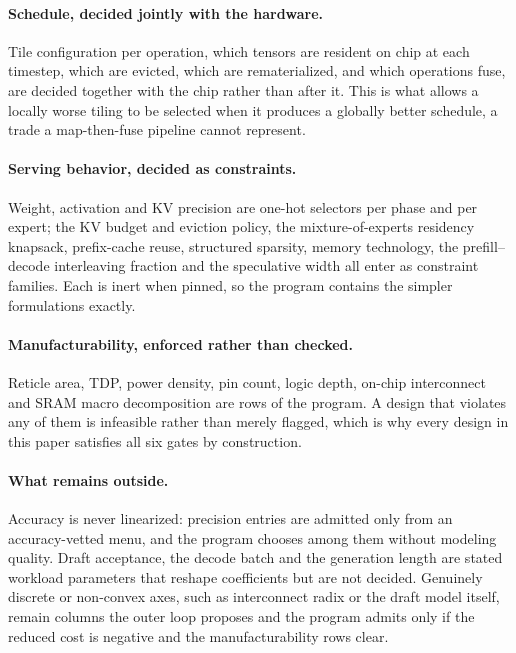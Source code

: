 \paragraph{Schedule, decided jointly with the hardware.}
Tile configuration per operation, which tensors are resident on chip at each
timestep, which are evicted, which are rematerialized, and which operations fuse,
are decided together with the chip rather than after it. This is what allows a
locally worse tiling to be selected when it produces a globally better schedule,
a trade a map-then-fuse pipeline cannot represent.

\paragraph{Serving behavior, decided as constraints.}
Weight, activation and KV precision are one-hot selectors per phase and per
expert; the KV budget and eviction policy, the mixture-of-experts residency
knapsack, prefix-cache reuse, structured sparsity, memory technology, the
prefill--decode interleaving fraction and the speculative width all enter as
constraint families. Each is inert when pinned, so the program contains the
simpler formulations exactly.

\paragraph{Manufacturability, enforced rather than checked.}
Reticle area, TDP, power density, pin count, logic depth, on-chip interconnect
and SRAM macro decomposition are rows of the program. A design that violates any
of them is infeasible rather than merely flagged, which is why every design in
this paper satisfies all six gates by construction.

\paragraph{What remains outside.}
Accuracy is never linearized: precision entries are admitted only from an
accuracy-vetted menu, and the program chooses among them without modeling
quality. Draft acceptance, the decode batch and the generation length are stated
workload parameters that reshape coefficients but are not decided. Genuinely
discrete or non-convex axes, such as interconnect radix or the draft model
itself, remain columns the outer loop proposes and the program admits only if the
reduced cost is negative and the manufacturability rows clear.


